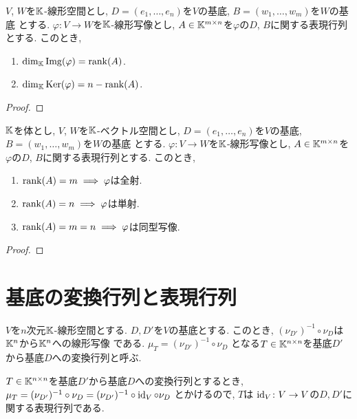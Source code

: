 \begin{prop}
  $V$, $W$を$\mathbb{K}$-線形空間とし,
  $D=(e_1,\ldots,e_n)$を$V$の基底,
  $B=(w_1,\ldots,w_m)$を$W$の基底
  とする.
  $\varphi\colon V\to W$を$\mathbb{K}$-線形写像とし,
  $A\in\mathbb{K}^{m\times n}$を$\varphi$の$D$, $B$に関する表現行列とする.
  このとき,
\begin{enumerate}
  \item $\dim_{\mathbb{K}}\operatorname{Img}(\varphi)=\operatorname{rank}(A)$.
  \item $\dim_{\mathbb{K}}\operatorname{Ker}(\varphi)=n-\operatorname{rank}(A)$.
\end{enumerate}
\end{prop}
\begin{proof}\end{proof}

\begin{prop}
  $\mathbb{K}$を体とし,
  $V$, $W$を$\mathbb{K}$-ベクトル空間とし,
  $D=(e_1,\ldots,e_n)$を$V$の基底,
  $B=(w_1,\ldots,w_m)$を$W$の基底
  とする.
  $\varphi\colon V\to W$を$\mathbb{K}$-線形写像とし,
  $A\in\mathbb{K}^{m\times n}$を$\varphi$の$D$, $B$に関する表現行列とする.
  このとき,
\begin{enumerate}
  \item $\operatorname{rank}(A)=m\implies \varphi$は全射.
  \item $\operatorname{rank}(A)=n\implies \varphi$は単射.
  \item $\operatorname{rank}(A)=m=n\implies \varphi$は同型写像.
\end{enumerate}
\end{prop}
\begin{proof}\end{proof}

\section{基底の変換行列と表現行列}

\begin{definition}
  $V$を$n$次元$\mathbb{K}$-線形空間とする.
  $D,D'$を$V$の基底とする.
  このとき, $(\nu_{D'})^{-1}\circ\nu_{D}$は$\mathbb{K}^n$から$\mathbb{K}^n$への線形写像
  である.
  $\mu_T=(\nu_{D'})^{-1}\circ\nu_{D}$
  となる$T\in\mathbb{K}^{n\times n}$を基底$D'$から基底$D$への変換行列と呼ぶ.
\end{definition}
\begin{remark}
  $T\in\mathbb{K}^{n\times n}$を基底$D'$から基底$D$への変換行列とするとき,
  $\mu_T=(\nu_{D'})^{-1}\circ\nu_{D}=(\nu_{D'})^{-1}\circ\operatorname{id}_{V}\circ\nu_{D}$
  とかけるので,
  $T$は
  $\operatorname{id}_{V}\colon V\to V$の$D,D'$に関する表現行列である.
\end{remark}

